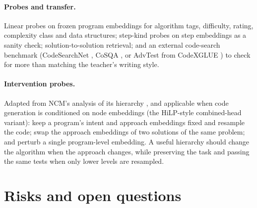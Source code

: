 \documentclass[11pt]{article}
\begin{document}
\paragraph{Probes and transfer.}
Linear probes on frozen program embeddings for algorithm tags, difficulty, rating, complexity class and data
structures; step-kind probes on step embeddings as a sanity check; solution-to-solution retrieval; and an external
code-search benchmark (CodeSearchNet \citep{husain2019codesearchnet}, CoSQA \citep{huang2021cosqa}, or AdvTest from
CodeXGLUE \citep{lu2021codexglue}) to check for more than matching the teacher's writing style.

\paragraph{Intervention probes.}
Adapted from NCM's analysis of its hierarchy \citep{kumbong2026ncm}, and applicable when code generation is
conditioned on node embeddings (the HiLP-style combined-head variant): keep a program's intent and approach
embeddings fixed and resample the code; swap the approach embeddings of two solutions of the same problem; and
perturb a single program-level embedding. A useful hierarchy should change the algorithm when the approach changes,
while preserving the task and passing the same tests when only lower levels are resampled.

\section{Risks and open questions}
\end{document}
